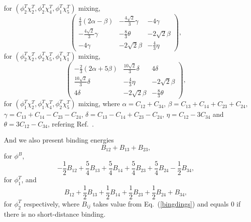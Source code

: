\documentclass[prt,twocolumn,floatfix,nofootinbib]{revtex4}
\begin{document}
for $(\phi_{2}^{T}\chi_{2}^{T},\phi_{2}^{T}\chi_{4}^{T},\phi_{1}^{T}\chi_{5}^{T})$ mixing,
\begin{equation}\label{221mixing254}
    \begin{pmatrix}
        \frac{4}{3}(2\alpha-\beta)  & -\frac{4\sqrt{2}}{3}\gamma    & -4\gamma \\
        -\frac{4\sqrt{2}}{3}\gamma  & -\frac{8}{3}\theta            & -2\sqrt{2}\beta \\
        -4\gamma                    & -2\sqrt{2}\beta               & -\frac{4}{3}\eta
    \end{pmatrix},
\end{equation}
for $(\phi_{2}^{T}\chi_{2}^{T},\phi_{2}^{T}\chi_{5}^{T},\phi_{1}^{T}\chi_{1}^{T})$ mixing,
\begin{equation}\label{112mixing245}
    \begin{pmatrix}
        -\frac{2}{3}(2\alpha+5\beta)    & \frac{10\sqrt{2}}{3}\delta    & 4\delta \\
        \frac{10\sqrt{2}}{3}\delta      & -\frac{4}{3}\eta              & -2\sqrt{2}\beta \\
        4\delta                         & -2\sqrt{2}\beta               & -\frac{8}{3}\theta
    \end{pmatrix},
\end{equation}
for $(\phi_{1}^{T}\chi_{2}^{T},\phi_{1}^{T}\chi_{4}^{T},\phi_{2}^{T}\chi_{5}^{T})$ mixing,
where $\alpha=C_{12}+C_{34}$, $\beta=C_{13}+C_{14}+C_{23}+C_{24}$, $\gamma=C_{13}+C_{14}-C_{23}-C_{24}$, $\delta=C_{13}-C_{14}+C_{23}-C_{24}$,
$\eta=C_{12}-3C_{34}$ and $\theta=3C_{12}-C_{34}$, refering Ref.~\cite{Luo:2017eub}.

And we also present binding energies
\begin{equation}
    B_{12}+B_{13}+B_{23},
\end{equation}
for $\phi^{B}$,
\begin{equation}\label{ph1binding}
    -\frac{1}{2}B_{12}+\frac{5}{4}B_{13}+\frac{5}{4}B_{14}+\frac{5}{4}B_{23}+\frac{5}{4}B_{24}-\frac{1}{2}B_{34},
\end{equation}
for $\phi_{1}^{T}$, and
\begin{equation}\label{ph2binding}
    B_{12}+\frac{1}{2}B_{13}+\frac{1}{2}B_{14}+\frac{1}{2}B_{23}+\frac{1}{2}B_{24}+B_{34},
\end{equation}
for $\phi_{2}^{T}$ respectively, where $B_{ij}$ takes value from Eq.~(\ref{bingdings}) and equals 0 if there is no short-distance binding.
\end{document}
